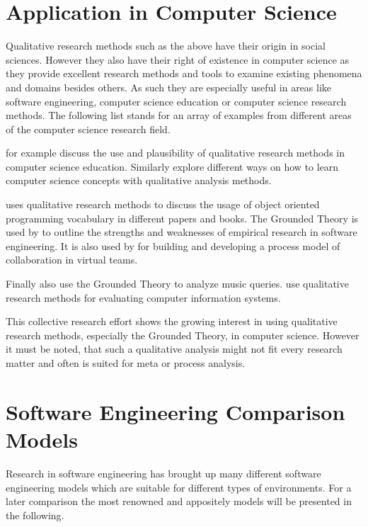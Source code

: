 
\section{Application in Computer Science} %

Qualitative research methods such as the above have their origin in social
sciences. However they also have their right of existence in computer science
as they provide excellent research methods and tools to examine existing
phenomena and domains besides others. As such they are especially useful in
areas like software engineering, computer science education or computer science
research methods. The following list stands for an array of examples from
different areas of the computer science research field.

\textcite{Hazzan2006} for example discuss the use and plausibility of
qualitative research methods in computer science education. Similarly
\textcite{Meerbaum-Salant2010} explore different ways on how to learn computer
science concepts with qualitative analysis methods.

\textcite{Armstrong2006} uses qualitative research methods to discuss the usage
of object oriented programming vocabulary in different papers and books. The
Grounded Theory is used by \textcite{Perry2000} to outline the strengths and
weaknesses of empirical research in software engineering. It is also used by
\textcite{Sarker2001} for building and developing a process model of
collaboration in virtual teams.

Finally also \textcite{Bainbridge2003} use the Grounded Theory to analyze
music queries. \textcite{Kaplan1994} use qualitative research methods for
evaluating computer information systems.

This collective research effort shows the growing interest in using qualitative
research methods, especially the Grounded Theory, in computer science. However
it must be noted, that such a qualitative analysis might not fit every research
matter and often is suited for meta or process analysis.


\section{Software Engineering Comparison Models} %

Research in software engineering has brought up many different software
engineering models which are suitable for different types of environments. For
a later comparison the most renowned and appositely models will be presented in
the following.

